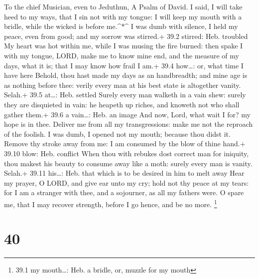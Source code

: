 To the chief Musician, even to Jeduthun, A Psalm of David. 
I said, I will take heed to my ways, that I sin not with my tongue: I
will keep my mouth with a bridle, while the wicked is before
me.\^{}*\^{}  I was dumb with silence, I held my peace, even
from good; and my sorrow was stirred.+ 39.2 stirred: Heb. troubled
 My heart was hot within me, while I was musing the fire
burned: then spake I with my tongue,  LORD, make me to know
mine end, and the measure of my days, what it is; that I may know how
frail I am.+ 39.4 how\ldots: or, what time I have here 
Behold, thou hast made my days as an handbreadth; and mine age is as
nothing before thee: verily every man at his best state is altogether
vanity. Selah.+ 39.5 at\ldots: Heb. settled  Surely every
man walketh in a vain shew: surely they are disquieted in vain: he
heapeth up riches, and knoweth not who shall gather them.+ 39.6 a
vain\ldots: Heb. an image  And now, Lord, what wait I for?
my hope is in thee.  Deliver me from all my transgressions:
make me not the reproach of the foolish.  I was dumb, I
opened not my mouth; because thou didst it.  Remove thy
stroke away from me: I am consumed by the blow of thine hand.+ 39.10
blow: Heb. conflict  When thou with rebukes dost correct
man for iniquity, thou makest his beauty to consume away like a moth:
surely every man is vanity. Selah.+ 39.11 his\ldots: Heb. that which is
to be desired in him to melt away  Hear my prayer, O LORD,
and give ear unto my cry; hold not thy peace at my tears: for I am a
stranger with thee, and a sojourner, as all my fathers were.
 O spare me, that I may recover strength, before I go
hence, and be no more. \footnote{39.1 my mouth\ldots: Heb. a bridle, or,
  muzzle for my mouth}

\hypertarget{section-39}{%
\section{40}\label{section-39}}

